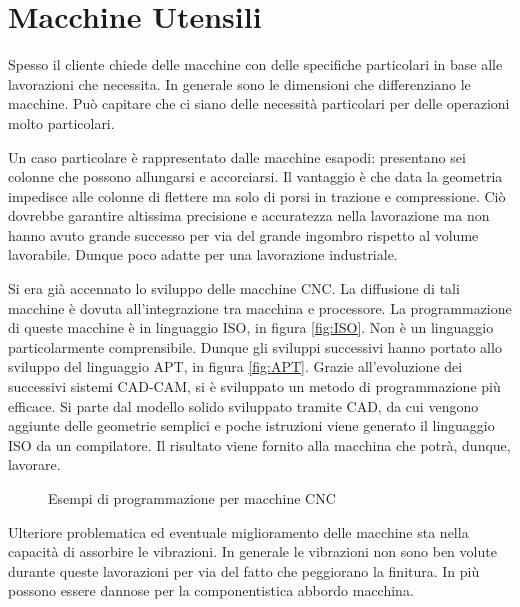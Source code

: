 \chapter{Macchine Utensili}\label{chp:MacchineUtensili}
Spesso il cliente chiede delle macchine con delle specifiche particolari
in base alle lavorazioni che necessita.
In generale sono le dimensioni che differenziano le macchine.
Può capitare che ci siano delle necessità particolari per delle operazioni 
molto particolari.

Un caso particolare è rappresentato dalle macchine esapodi: presentano sei colonne che possono allungarsi e accorciarsi. Il vantaggio è che data la geometria impedisce alle colonne di flettere ma solo di porsi in trazione e compressione.
Ciò dovrebbe garantire altissima precisione e accuratezza nella lavorazione ma non hanno avuto grande successo per via del grande ingombro rispetto al volume lavorabile. Dunque poco adatte per una lavorazione industriale.

Si era già accennato lo sviluppo delle macchine \ac{CNC}.
La diffusione di tali macchine è dovuta all'integrazione tra macchina e 
processore. La programmazione di queste macchine è in linguaggio ISO, in figura \ref{fig:ISO}.
Non è un linguaggio particolarmente comprensibile. Dunque gli sviluppi successivi hanno portato allo sviluppo del linguaggio APT, in figura \ref{fig:APT}.
Grazie all'evoluzione dei successivi sistemi CAD-CAM, si è sviluppato un metodo di programmazione più efficace. Si parte dal modello solido sviluppato tramite CAD, da cui vengono aggiunte delle geometrie semplici e poche istruzioni viene generato il linguaggio ISO da un compilatore.
Il risultato viene fornito alla macchina che potrà, dunque, lavorare.

\begin{figure}
\centering
{}\quad
{}
\caption{Esempi di programmazione per macchine CNC}
\label{fig:CNC}
\end{figure}

Ulteriore problematica ed eventuale miglioramento delle macchine sta nella capacità di assorbire le vibrazioni. In generale le vibrazioni non sono ben volute durante queste lavorazioni per via del fatto che peggiorano la finitura. In più possono essere dannose per la componentistica abbordo macchina.

